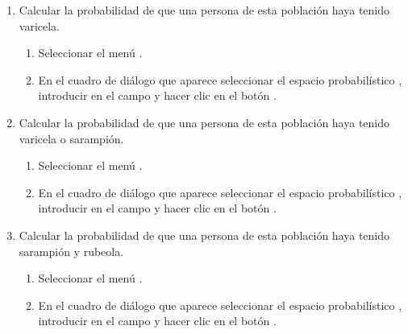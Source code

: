 \begin{enumerate}[leftmargin=*]
\begin{enumerate}
\item Calcular la probabilidad de que una persona de esta población haya tenido varicela. 
\begin{indicacion}
\begin{enumerate}
\item Seleccionar el menú .
\item En el cuadro de diálogo que aparece seleccionar el espacio probabilístico , introducir
 en el campo  y hacer clic en el botón .
\end{enumerate}
\end{indicacion} 

\item Calcular la probabilidad de que una persona de esta población haya tenido varicela o sarampión. 
\begin{indicacion}
\begin{enumerate}
\item Seleccionar el menú .
\item En el cuadro de diálogo que aparece seleccionar el espacio probabilístico , introducir
 en el campo  y hacer clic en el botón .
\end{enumerate}
\end{indicacion} 

\item Calcular la probabilidad de que una persona de esta población haya tenido sarampión y rubeola. 
\begin{indicacion}
\begin{enumerate}
\item Seleccionar el menú .
\item En el cuadro de diálogo que aparece seleccionar el espacio probabilístico , introducir
 en el campo  y hacer clic en el botón .
\end{enumerate}
\end{indicacion} 


\end{enumerate}
\end{enumerate}
